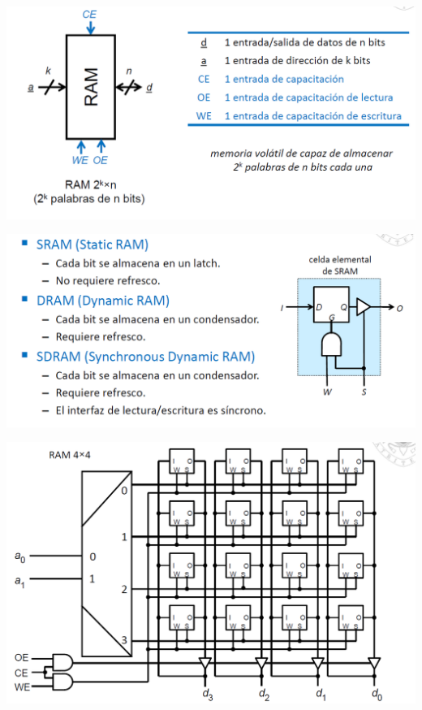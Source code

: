 \documentclass[a4paper,10pt]{book}
\begin{document}
\begin{center}
\includegraphics[scale=0.45]{Memoria RAM}
\end{center}

\begin{center}
\includegraphics[scale=0.45]{tipos RAM}
\end{center}

\begin{center}
\includegraphics[scale=0.5]{implementacion memoria RAM}
\end{center}
\end{document}
